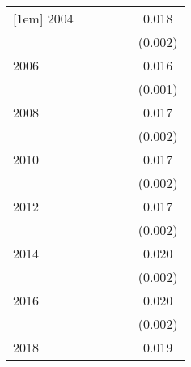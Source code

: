 {\begin{tabular}{l*{5}{c}}
[1em]
2004                &                     &                     &                     &                     &       0.018\sym{***}\\
                    &                     &                     &                     &                     &     (0.002)         \\
[1em]
2006                &                     &                     &                     &                     &       0.016\sym{***}\\
                    &                     &                     &                     &                     &     (0.001)         \\
[1em]
2008                &                     &                     &                     &                     &       0.017\sym{***}\\
                    &                     &                     &                     &                     &     (0.002)         \\
[1em]
2010                &                     &                     &                     &                     &       0.017\sym{***}\\
                    &                     &                     &                     &                     &     (0.002)         \\
[1em]
2012                &                     &                     &                     &                     &       0.017\sym{***}\\
                    &                     &                     &                     &                     &     (0.002)         \\
[1em]
2014                &                     &                     &                     &                     &       0.020\sym{***}\\
                    &                     &                     &                     &                     &     (0.002)         \\
[1em]
2016                &                     &                     &                     &                     &       0.020\sym{***}\\
                    &                     &                     &                     &                     &     (0.002)         \\
[1em]
2018                &                     &                     &                     &                     &       0.019\sym{***}\\

\end{tabular}}
